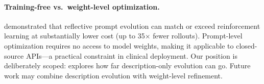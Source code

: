 \paragraph{Training-free vs.\ weight-level optimization.}
\citet{gepa2025} demonstrated that reflective prompt evolution can match or exceed reinforcement learning at substantially lower cost (up to 35$\times$ fewer rollouts).
Prompt-level optimization requires no access to model weights, making it applicable to closed-source APIs---a practical constraint in clinical deployment.
Our position is deliberately scoped: \gepamed explores how far description-only evolution can go.
Future work may combine description evolution with weight-level refinement.
